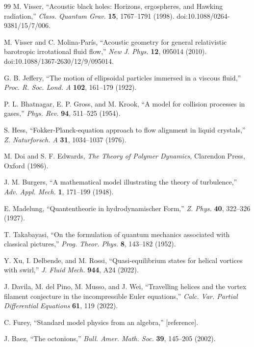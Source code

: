 \documentclass[11pt]{article}
\numberwithin{equation}{section}
\begin{document}
\begin{thebibliography}{99}
	M. Visser,
	``Acoustic black holes: Horizons, ergospheres, and Hawking radiation,''
	\emph{Class. Quantum Grav.} \textbf{15}, 1767--1791 (1998).
	\newblock doi:10.1088/0264-9381/15/7/006.

	M. Visser and C. Molina-Par\'is,
	``Acoustic geometry for general relativistic barotropic irrotational fluid flow,''
	\emph{New J. Phys.} \textbf{12}, 095014 (2010).
	\newblock doi:10.1088/1367-2630/12/9/095014.

		G. B. Jeffery,
		``The motion of ellipsoidal particles immersed in a viscous fluid,''
		\emph{Proc. R. Soc. Lond. A} \textbf{102}, 161--179 (1922).
		
		P. L. Bhatnagar, E. P. Gross, and M. Krook,
		``A model for collision processes in gases,''
		\emph{Phys. Rev.} \textbf{94}, 511--525 (1954).
		
		S. Hess,
		``Fokker-Planck-equation approach to flow alignment in liquid crystals,''
		\emph{Z. Naturforsch. A} \textbf{31}, 1034--1037 (1976).
		
		M. Doi and S. F. Edwards,
		\emph{The Theory of Polymer Dynamics},
		Clarendon Press, Oxford (1986).
		
		J. M. Burgers,
		``A mathematical model illustrating the theory of turbulence,''
		\emph{Adv. Appl. Mech.} \textbf{1}, 171--199 (1948).
		
		E. Madelung,
		``Quantentheorie in hydrodynamischer Form,''
		\emph{Z. Phys.} \textbf{40}, 322--326 (1927).
		
		T. Takabayasi,
		``On the formulation of quantum mechanics associated with classical pictures,''
		\emph{Prog. Theor. Phys.} \textbf{8}, 143--182 (1952).
		
		Y. Xu, I. Delbende, and M. Rossi,
		``Quasi-equilibrium states for helical vortices with swirl,''
		\emph{J. Fluid Mech.} \textbf{944}, A24 (2022).
		
		J. Davila, M. del Pino, M. Musso, and J. Wei,
		``Travelling helices and the vortex filament conjecture
		in the incompressible Euler equations,''
		\emph{Calc. Var. Partial Differential Equations} \textbf{61}, 119 (2022).
		
		C. Furey,
		``Standard model physics from an algebra,''
		[reference].
		
		J. Baez,
		``The octonions,''
		\emph{Bull. Amer. Math. Soc.} \textbf{39}, 145--205 (2002).
		
	\end{thebibliography}
	
\end{document}
